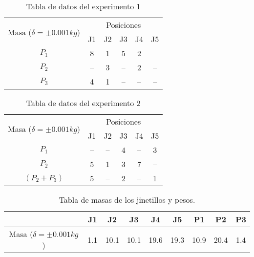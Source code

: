 \documentclass[../main.tex]{subfiles}
\begin{document}
\begin{table}[H]
    \centering
    \begin{tabular}{c|c|c|c|c|c}
        \hline
        \multirow{2}{*}{Masa ($\delta = \pm 0.001kg$)}     
         & \multicolumn{5}{c}{Posiciones}\\
        \cline{2-6}
              &  J1  &  J2  &  J3  &  J4  &  J5 \\  
        \hline
        $P_1$ &  8   &  1   &  5   &  2   &  -- \\   
        $P_2$ &  --  &  3   &  --  &  2   &  -- \\ 
        $P_3$ &  4   &  1   &  --  &  --  &  -- \\ 
        \hline
    \end{tabular}
    \label{ref:table1}
    \caption{Tabla de datos del experimento 1}
\end{table}

\begin{table}[H]
    \centering
    \begin{tabular}{c|c|c|c|c|c}
        \hline
        \multirow{2}{*}{Masa ($\delta = \pm 0.001kg$)}     
         & \multicolumn{5}{c}{Posiciones}\\
        \cline{2-6}
             &  J1  &  J2  &  J3  &  J4  &  J5 \\  
        \hline
        $P_1$ &  --  &  --   &  4  &  --  &  3 \\ 
        $P_2$ &  5   &  1    &  3  &  7   &  -- \\   
        $(P_2 + P_3)$  &  5   &  --  &  2  &  --  &  1 \\ 
        \hline
    \end{tabular}
    \label{ref:table2}
    \caption{Tabla de datos del experimento 2}
\end{table}

\begin{table}[H]
    \centering
    \begin{tabular}{c|c|c|c|c|c|c|c|c}
    \cline{2-9}
                                  &  J1   &  J2    &  J3    &  J4   &  J5  & P1   & P2   & P3\\ 
    \hline
    Masa ($\delta = \pm 0.001kg$) &  1.1  &  10.1  &  10.1  &  19.6 & 19.3 & 10.9 & 20.4 & 1.4 \\
    \hline 
    \end{tabular}
    \caption{Tabla de masas de los jinetillos y pesos.}
\end{table}
\end{document}
